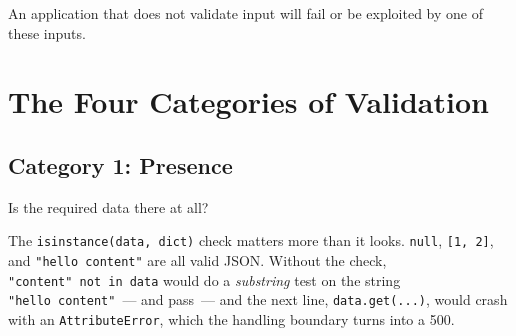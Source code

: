 \noindent{}An application that does not validate input will fail or be exploited by one of these inputs.

\setcounter{section}{1}
\section{The Four Categories of Validation}\label{31-input-handling:312-the-four-categories-of-validation}

\subsection*{Category 1: Presence}\label{31-input-handling:category-1-presence}

Is the required data there at all?

\begin{codebox}[short]

\begin{Shaded}
\begin{Highlighting}[]
\OperatorTok{=}\OperatorTok{=}\NormalTok{)}
  \NormalTok{):}
    \NormalTok{: }\NormalTok{\}), }

   
    \NormalTok{: }\NormalTok{\}), }
\end{Highlighting}
\end{Shaded}

\end{codebox}

\noindent{}The \texttt{isinstance(data,}\allowbreak{}\texttt{\ dict)} check matters more than it looks. \texttt{null}, \texttt{{[}1,\ 2{]}}, and \texttt{"hello\ content"} are all valid JSON. Without the check, \texttt{"content"\ not\ in\ data} would do a \emph{substring} test on the string \texttt{"hello\ content"}~--- and pass~--- and the next line, \texttt{data.get(...)}, would crash with an \texttt{AttributeError}, which the handling boundary turns into a 500.

